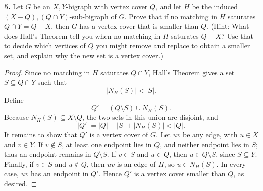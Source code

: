 \documentclass[12pt]{amsart}
\theoremstyle{conjecture}
\theoremstyle{definition}
\theoremstyle{question}
\theoremstyle{theorem}
\begin{document}
    \noindent\textbf{5.} Let \(G\) be an \(X,Y\)-bigraph with vertex cover \(Q\), and let
    \(H\) be the induced \((X-Q),(Q\cap Y)\)-sub-bigraph of \(G\).
    Prove that if no matching in \(H\) saturates \(Q\cap Y=Q-X\),
    then \(G\) has a vertex cover that is smaller than \(Q\).
    (Hint: What does Hall's Theorem tell you when no matching in
    \(H\) saturates \(Q-X\)? Use that to decide which vertices of \(Q\)
    you might remove and replace to obtain a smaller set, and explain
    why the new set is a vertex cover.)

    \begin{proof}
    Since no matching in \(H\) saturates \(Q\cap Y\), Hall's
    Theorem gives a set \(S\subseteq Q\cap Y\) such that
    \[
        |N_H(S)|<|S|.
    \]
    Define
    \[
        Q'=(Q\setminus S)\cup N_H(S).
    \]
    Because \(N_H(S)\subseteq X\setminus Q\), the two sets in this
    union are disjoint, and
    \[
        |Q'|=|Q|-|S|+|N_H(S)|<|Q|.
    \]
    It remains to show that \(Q'\) is a vertex cover of \(G\).
    Let \(uv\) be any edge, with \(u\in X\) and \(v\in Y\).
    If \(v\notin S\), at least one endpoint lies in \(Q\), and
    neither endpoint lies in \(S\); thus an endpoint remains in
    \(Q\setminus S\). If \(v\in S\) and \(u\in Q\), then
    \(u\in Q\setminus S\), since \(S\subseteq Y\). Finally, if
    \(v\in S\) and \(u\notin Q\), then \(uv\) is an edge of
    \(H\), so \(u\in N_H(S)\). In every case, \(uv\) has an
    endpoint in \(Q'\). Hence \(Q'\) is a vertex cover smaller
    than \(Q\), as desired.
    \end{proof}
\end{document}
